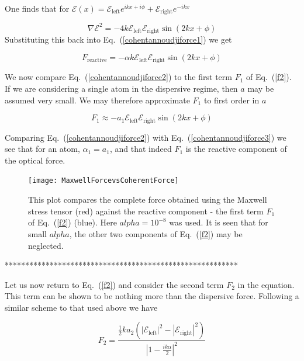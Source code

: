 \documentclass[twocolumn,english,pra,aps,superscriptaddress,floatfix]{revtex4-1}
\begin{document}
One finds that for $\mathcal{E}(x)=\mathcal{E}_{\mathrm{left}}e^{ikx+i\phi}+\mathcal{E}_{\mathrm{right}}e^{-ikx}$

\begin{equation}
\nabla \mathcal{E}^{2}=-4k\mathcal{E}_{\mathrm{left}}\mathcal{E}_{\mathrm{right}}\sin\left(2kx+\phi\right)
\label{gradiantE}
\end{equation}
Substituting this back into Eq.\ (\ref{cohentannoudjiforce1}) we get

\begin{equation}
F_{\mathrm{reactive}}=-\alpha k\mathcal{E}_{\mathrm{left}}\mathcal{E}_{\mathrm{right}}\sin\left(2kx+\phi\right)
\label{cohentannoudjiforce2}
\end{equation}

We now compare Eq.\ (\ref{cohentannoudjiforce2}) to the first term $F_{1}$ of Eq.\ (\ref{f2}). If we are considering a single atom in the dispersive regime, then
$a$ may be assumed very small. We may therefore approximate $F_{1}$ to first order in $a$ 

\begin{equation}
F_{1}\approx-a_{1} \mathcal{E}_{\mathrm{left}}\mathcal{E}_{\mathrm{right}}\sin\left(2kx+\phi\right)
\label{cohentannoudjiforce3}
\end{equation}

Comparing Eq.\ (\ref{cohentannoudjiforce2}) with Eq.\ (\ref{cohentannoudjiforce3}) we see that for an atom, $\alpha_{1}=a_{1}$, and that indeed $F_{1}$ is the reactive component of the optical force. 

\begin{figure}
\texttt{[image: MaxwellForcevsCoherentForce]}
\caption{This plot compares the complete force obtained using the Maxwell stress tensor (red) against the reactive component - the first term $F_{1}$ of Eq.\ (\ref{f2}) (blue).  Here $alpha=10^{-8}$ was used.  It is seen that for small $alpha$, the other two components of Eq.\ (\ref{f2}) may be neglected.}
\label{fig:forcecompare}
\end{figure}
*********************************************************

 Let us now return to Eq.\ (\ref{f2}) and consider the second term $F_{2}$ in the equation.  This term can be shown to be nothing more than the dispersive force.  Following a similar scheme to that used above we have 


\begin{equation}
F_{2}=\frac{\frac{1}{2}ka_{2}\left(\left|\mathcal{E}_{\mathrm{left}}\right|^{2}-\left|\mathcal{E}_{\mathrm{right}}\right|^{2}\right)}{\left|1-\frac{ik\alpha}{2}\right|^{2}}
\label{secondforce1}
\end{equation}
\end{document}
